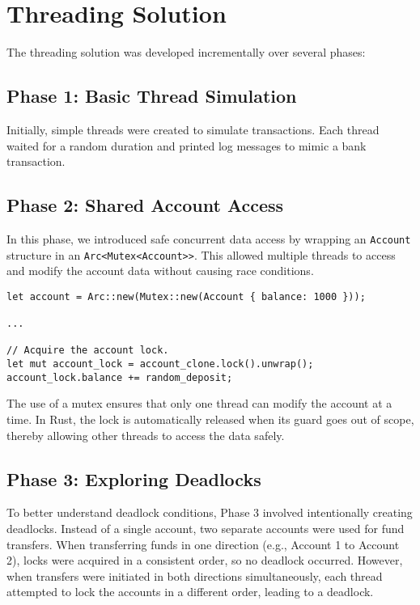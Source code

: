 \documentclass[conference]{report}
\begin{document}
\section*{Threading Solution}
The threading solution was developed incrementally over several phases:

\subsection*{Phase 1: Basic Thread Simulation}
Initially, simple threads were created to simulate transactions. Each thread waited for a random duration and printed log messages to mimic a bank transaction.

\subsection*{Phase 2: Shared Account Access}
In this phase, we introduced safe concurrent data access by wrapping an \texttt{Account} structure in an \texttt{Arc<Mutex<Account>>}. This allowed multiple threads to access and modify the account data without causing race conditions.

\hfill
\begin{lstlisting}[caption={Creating a Thread-Accessible Account}, label=code:phase2-account-creation]
let account = Arc::new(Mutex::new(Account { balance: 1000 }));

...

// Acquire the account lock.
let mut account_lock = account_clone.lock().unwrap();
account_lock.balance += random_deposit;
\end{lstlisting}

The use of a mutex ensures that only one thread can modify the account at a time. In Rust, the lock is automatically released when its guard goes out of scope, thereby allowing other threads to access the data safely.

\subsection*{Phase 3: Exploring Deadlocks}
To better understand deadlock conditions, Phase 3 involved intentionally creating deadlocks. Instead of a single account, two separate accounts were used for fund transfers. When transferring funds in one direction (e.g., Account 1 to Account 2), locks were acquired in a consistent order, so no deadlock occurred. However, when transfers were initiated in both directions simultaneously, each thread attempted to lock the accounts in a different order, leading to a deadlock.
\end{document}
